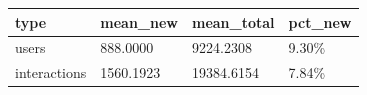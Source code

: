 \begin{tabular}{llll}
\toprule
type & mean_new & mean_total & pct_new \\
\midrule
users & 888.0000 & 9224.2308 & 9.30\% \\
interactions & 1560.1923 & 19384.6154 & 7.84\% \\
\bottomrule
\end{tabular}
